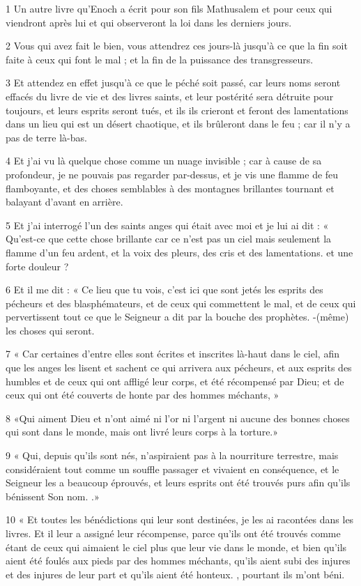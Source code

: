 \par 1 Un autre livre qu'Enoch a écrit pour son fils Mathusalem et pour ceux qui viendront après lui et qui observeront la loi dans les derniers jours.
\par 2 Vous qui avez fait le bien, vous attendrez ces jours-là jusqu'à ce que la fin soit faite à ceux qui font le mal ; et la fin de la puissance des transgresseurs.
\par 3 Et attendez en effet jusqu'à ce que le péché soit passé, car leurs noms seront effacés du livre de vie et des livres saints, et leur postérité sera détruite pour toujours, et leurs esprits seront tués, et ils ils crieront et feront des lamentations dans un lieu qui est un désert chaotique, et ils brûleront dans le feu ; car il n’y a pas de terre là-bas.
\par 4 Et j'ai vu là quelque chose comme un nuage invisible ; car à cause de sa profondeur, je ne pouvais pas regarder par-dessus, et je vis une flamme de feu flamboyante, et des choses semblables à des montagnes brillantes tournant et balayant d'avant en arrière.
\par 5 Et j'ai interrogé l'un des saints anges qui était avec moi et je lui ai dit : « Qu'est-ce que cette chose brillante car ce n'est pas un ciel mais seulement la flamme d'un feu ardent, et la voix des pleurs, des cris et des lamentations. et une forte douleur ?
\par 6 Et il me dit : « Ce lieu que tu vois, c'est ici que sont jetés les esprits des pécheurs et des blasphémateurs, et de ceux qui commettent le mal, et de ceux qui pervertissent tout ce que le Seigneur a dit par la bouche des prophètes. -(même) les choses qui seront.
\par 7 « Car certaines d'entre elles sont écrites et inscrites là-haut dans le ciel, afin que les anges les lisent et sachent ce qui arrivera aux pécheurs, et aux esprits des humbles et de ceux qui ont affligé leur corps, et été récompensé par Dieu; et de ceux qui ont été couverts de honte par des hommes méchants, »
\par 8 «Qui aiment Dieu et n'ont aimé ni l'or ni l'argent ni aucune des bonnes choses qui sont dans le monde, mais ont livré leurs corps à la torture.»
\par 9 « Qui, depuis qu'ils sont nés, n'aspiraient pas à la nourriture terrestre, mais considéraient tout comme un souffle passager et vivaient en conséquence, et le Seigneur les a beaucoup éprouvés, et leurs esprits ont été trouvés purs afin qu'ils bénissent Son nom. .»
\par 10 « Et toutes les bénédictions qui leur sont destinées, je les ai racontées dans les livres. Et il leur a assigné leur récompense, parce qu'ils ont été trouvés comme étant de ceux qui aimaient le ciel plus que leur vie dans le monde, et bien qu'ils aient été foulés aux pieds par des hommes méchants, qu'ils aient subi des injures et des injures de leur part et qu'ils aient été honteux. , pourtant ils m’ont béni.
